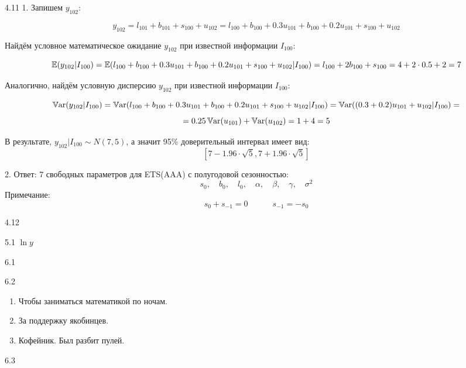 \begin{solution}{{4.11}}
1. Запишем $y_{102}$:

$$
y_{102} = l_{101} + b_{101} + s_{100} + u_{102} = l_{100} + b_{100} + 0.3 u_{101} + b_{100} + 0.2 u_{101} + s_{100} + u_{102}
$$

Найдём условное математическое ожидание $y_{102}$ при известной информации $I_{100}$:

$$
\operatorname{\mathbb{E}}(y_{102}|I_{100}) = \operatorname{\mathbb{E}}(l_{100} + b_{100} + 0.3 u_{101} + b_{100} + 0.2 u_{101} + s_{100} + u_{102}|I_{100}) = l_{100} + 2 b_{100} + s_{100} = 4 + 2 \cdot 0.5 + 2 = 7
$$

Аналогично, найдём условную дисперсию $y_{102}$ при известной информации $I_{100}$:

$$
\operatorname{\mathbb{V}\mathrm{ar}}(y_{102}|I_{100}) = \operatorname{\mathbb{V}\mathrm{ar}}(l_{100} + b_{100} + 0.3 u_{101} + b_{100} + 0.2 u_{101} + s_{100} + u_{102}|I_{100}) = \operatorname{\mathbb{V}\mathrm{ar}}((0.3+0.2)u_{101} + u_{102}|I_{100}) =
$$
$$
= 0.25 \operatorname{\mathbb{V}\mathrm{ar}}(u_{101}) + \operatorname{\mathbb{V}\mathrm{ar}}(u_{102}) = 1 + 4 = 5
$$

В результате, $y_{102}|I_{100} \sim N(7, 5)$, а значит 95\% доверительный интервал имеет вид:
$$
\left[7 - 1.96 \cdot \sqrt{5}, 7 + 1.96 \cdot \sqrt{5} \right]
$$

2. Ответ: 7 свободных параметров для ETS(AAA) с полугодовой сезонностью:
$$
s_0, \quad b_0,  \quad l_0, \quad \alpha, \quad \beta, \quad \gamma, \quad \sigma^2
$$
Примечание: 
$$
s_0 + s_{-1} = 0 \quad \quad \quad  s_{-1} = - s_{0}
$$
\end{solution}
\protect \hypertarget {soln:4.12}{}
\begin{solution}{{4.12}}
\end{solution}
\protect \hypertarget {soln:5.1}{}
\begin{solution}{{5.1}}
  $\ln y$
\end{solution}
\protect \hypertarget {soln:6.1}{}
\begin{solution}{{6.1}}
\end{solution}
\protect \hypertarget {soln:6.2}{}
\begin{solution}{{6.2}}
    \begin{enumerate}
      \item Чтобы заниматься математикой по ночам.
      \item За поддержку якобинцев.
      \item Кофейник. Был разбит пулей.
    \end{enumerate}
\end{solution}
\protect \hypertarget {soln:6.3}{}
\begin{solution}{{6.3}}
  
\end{solution}

